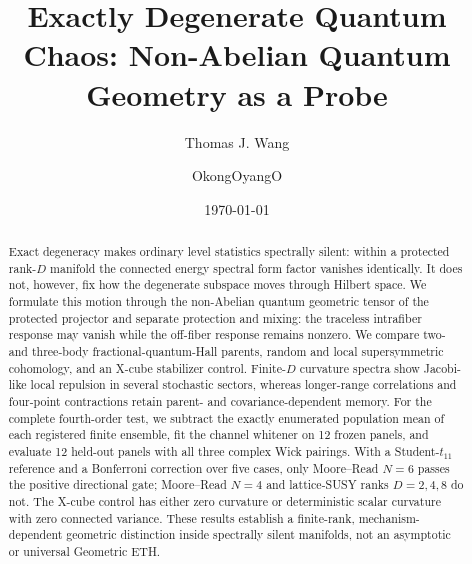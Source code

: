 \documentclass[aps,prb,reprint,superscriptaddress,longbibliography,floatfix]{revtex4-2}
\begin{document}
\title{Exactly Degenerate Quantum Chaos: Non-Abelian Quantum Geometry as a Probe}

\author{Thomas J. Wang}

\author{OkongOyangO}

\date{\today}

\begin{abstract}
Exact degeneracy makes ordinary level statistics spectrally silent: within a protected rank-$D$ manifold the connected energy spectral form factor vanishes identically. It does not, however, fix how the degenerate subspace moves through Hilbert space. We formulate this motion through the non-Abelian quantum geometric tensor of the protected projector and separate protection and mixing: the traceless intrafiber response may vanish while the off-fiber response remains nonzero. We compare two- and three-body fractional-quantum-Hall parents, random and local supersymmetric cohomology, and an X-cube stabilizer control. Finite-$D$ curvature spectra show Jacobi-like local repulsion in several stochastic sectors, whereas longer-range correlations and four-point contractions retain parent- and covariance-dependent memory. For the complete fourth-order test, we subtract the exactly enumerated population mean of each registered finite ensemble, fit the channel whitener on 12 frozen panels, and evaluate 12 held-out panels with all three complex Wick pairings. With a Student-$t_{11}$ reference and a Bonferroni correction over five cases, only Moore--Read $N=6$ passes the positive directional gate; Moore--Read $N=4$ and lattice-SUSY ranks $D=2,4,8$ do not. The X-cube control has either zero curvature or deterministic scalar curvature with zero connected variance. These results establish a finite-rank, mechanism-dependent geometric distinction inside spectrally silent manifolds, not an asymptotic or universal Geometric ETH.
\end{abstract}

\maketitle


\end{document}
